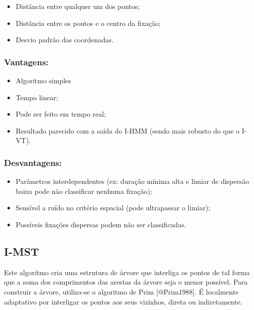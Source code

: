 \begin{itemize}
\itemsep1pt\parskip0pt
\item
  Distância entre qualquer um dos pontos;
\item
  Distância entre os pontos e o centro da fixação;
\item
  Desvio padrão das coordenadas.
\end{itemize}

\subsubsection{Vantagens:}\label{vantagens-2}

\begin{itemize}
\itemsep1pt\parskip0pt
\item
  Algoritmo simples
\item
  Tempo linear;
\item
  Pode ser feito em tempo real;
\item
  Resultado parecido com a saída do I-HMM (sendo mais robusto do que o
  I-VT).
\end{itemize}

\subsubsection{Desvantagens:}\label{desvantagens-2}

\begin{itemize}
\itemsep1pt\parskip0pt
\item
  Parâmetros interdependentes (ex: duração mínima alta e limiar de
  dispersão baixa pode não classificar nenhuma fixação);
\item
  Sensível a ruído no critério espacial (pode ultrapassar o limiar);
\item
  Possíveis fixações dispersas podem não ser classificadas.
\end{itemize}

\subsection{I-MST}\label{i-mst}

Este algoritmo cria uma estrutura de árvore que interliga os pontos de
tal forma que a soma dos comprimentos das arestas da árvore seja o menor
possível. Para construir a árvore, utiliza-se o algoritmo de Prim
{[}@Prim1988{]}. É localmente adaptativo por interligar os pontos aos
seus vizinhos, direta ou indiretamente.


